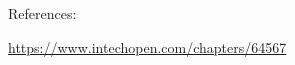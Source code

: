 \documentclass[11pt]{article}
\newcommand{\mathse}[1]{\begin{gather*}#1\end{gather*}}
\newcommand{\mat}[1]{\begin{bmatrix} #1 \end{bmatrix}}
\newcommand{\sinput}[1]{}
\begin{document}




\newpage
\begin{center}
    References:
\end{center}
\url{https://www.intechopen.com/chapters/64567}
\end{document}
